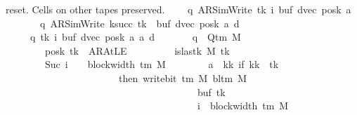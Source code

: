 \begin{isabellebody}
{       reset.  Cells on other tapes preserved.%
}\isanewline
\ \ \ \ {\isacharbraceleft}{\kern0pt}{\isacharparenleft}{\kern0pt}{\isacharparenleft}{\kern0pt}q{\isacharcomma}{\kern0pt}\ AR{\isacharunderscore}{\kern0pt}SimWrite{\isacharcomma}{\kern0pt}\ tk{\isacharcomma}{\kern0pt}\ i{\isacharcomma}{\kern0pt}\ buf{\isacharcomma}{\kern0pt}\ dvec{\isacharcomma}{\kern0pt}\ posk{\isacharparenright}{\kern0pt}{\isacharcomma}{\kern0pt}\ a{\isacharcomma}{\kern0pt}\isanewline
\ \ \ \ \ \ \ {\isacharparenleft}{\kern0pt}q{\isacharcomma}{\kern0pt}\ AR{\isacharunderscore}{\kern0pt}SimWrite{\isacharcomma}{\kern0pt}\ k{\isacharunderscore}{\kern0pt}succ\ tk{\isacharcomma}{\kern0pt}\ {}{\isacharcomma}{\kern0pt}\ buf{\isacharcomma}{\kern0pt}\ dvec{\isacharcomma}{\kern0pt}\ posk{\isacharparenright}{\kern0pt}{\isacharcomma}{\kern0pt}\ a{\isacharprime}{\kern0pt}{\isacharcomma}{\kern0pt}\ d{\isacharparenright}{\kern0pt}\ {\isacharbar}{\kern0pt}\isanewline
\ \ \ \ \ q\ tk\ i\ buf\ dvec\ posk\ a\ a{\isacharprime}{\kern0pt}\ d{\isachardot}{\kern0pt}\isanewline
\ \ \ \ \ \ \ q\ {\isasymin}\ Q{\isacharunderscore}{\kern0pt}tm\ M\isanewline
\ \ \ \ \ \ \ {\isasymand}\ posk\ tk\ {\isasymnoteq}\ AR{\isacharunderscore}{\kern0pt}AtLE\isanewline
\ \ \ \ \ \ \ {\isasymand}\ {\isasymnot}\ is{\isacharunderscore}{\kern0pt}last{\isacharunderscore}{\kern0pt}k\ M\ tk\isanewline
\ \ \ \ \ \ \ {\isasymand}\ Suc\ i\ {\isacharequal}{\kern0pt}\ {}\ {\isacharasterisk}{\kern0pt}\ block{\isacharunderscore}{\kern0pt}width\ {\isacharparenleft}{\kern0pt}{\isasymGamma}{\isacharunderscore}{\kern0pt}tm\ M{\isacharparenright}{\kern0pt}\isanewline
\ \ \ \ \ \ \ {\isasymand}\ a{\isacharprime}{\kern0pt}\ {\isacharequal}{\kern0pt}\ {\isacharparenleft}{\kern0pt}{\isasymlambda}kk{\isachardot}{\kern0pt}\ if\ kk\ {\isacharequal}{\kern0pt}\ tk\isanewline
\ \ \ \ \ \ \ \ \ \ \ \ \ \ \ \ \ \ \ \ \ \ \ then\ write{\isacharunderscore}{\kern0pt}bit\ {\isacharparenleft}{\kern0pt}{\isasymGamma}{\isacharunderscore}{\kern0pt}tm\ M{\isacharparenright}{\kern0pt}\ {\isacharparenleft}{\kern0pt}bl{\isacharunderscore}{\kern0pt}tm\ M{\isacharparenright}{\kern0pt}\isanewline
\ \ \ \ \ \ \ \ \ \ \ \ \ \ \ \ \ \ \ \ \ \ \ \ \ \ \ \ \ \ \ \ \ \ \ \ \ \ \ {\isacharparenleft}{\kern0pt}buf\ tk{\isacharparenright}{\kern0pt}\isanewline
\ \ \ \ \ \ \ \ \ \ \ \ \ \ \ \ \ \ \ \ \ \ \ \ \ \ \ \ \ \ \ \ \ \ \ \ \ \ \ {\isacharparenleft}{\kern0pt}i\ {\isacharminus}{\kern0pt}\ block{\isacharunderscore}{\kern0pt}width\ {\isacharparenleft}{\kern0pt}{\isasymGamma}{\isacharunderscore}{\kern0pt}tm\ M{\isacharparenright}{\kern0pt}{\isacharparenright}{\kern0pt}\isanewline

\end{isabellebody}
